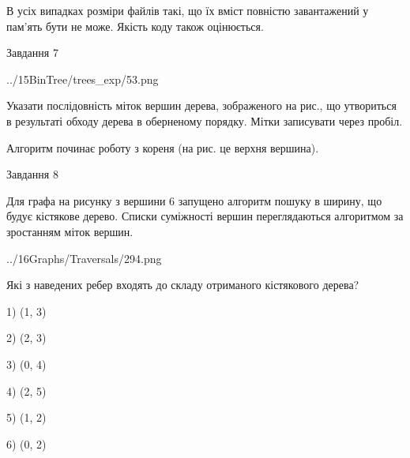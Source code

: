 \documentclass[12pt, ukrainian]{article}
\begin{document}
{В усіх випадках розміри файлів такі, що їх вміст повністю завантажений у пам'ять бути не може. Якість коду також оцінюється.



\vspace{10mm}\par

\newpage
\begin{minipage}[t]{9.7cm}
               
{\begin{center}Завдання {7}\end{center}}
\vspace{-4mm}

\begin{center}
	{../15BinTree/trees_exp/53.png}
\end{center}
Указати послідовність міток вершин дерева, зображеного на рис., що утвориться в результаті обходу дерева в оберненому порядку. Мітки записувати через пробіл.\par Алгоритм починає роботу з кореня (на рис. це верхня вершина).\par

\end{minipage}
\vline \hspace{8mm}
\begin{minipage}[t]{8.0cm}
               
{\begin{center}Завдання {8}\end{center}}
\vspace{-4mm}
Для графа на рисунку з вершини 6 запущено алгоритм пошуку в ширину, що будує кістякове дерево. Списки суміжності вершин переглядаються алгоритмом за зростанням міток вершин.\par
\begin{center}
	{../16Graphs/Traversals/294.png}
\end{center}
\par Які з наведених ребер входять до складу отриманого кістякового дерева?\par
1) (1, 3)\par
2) (2, 3)\par
3) (0, 4)\par
4) (2, 5)\par
5) (1, 2)\par
6) (0, 2)\par
{\vskip 15pt} \par


\end{minipage}}
\end{document}
